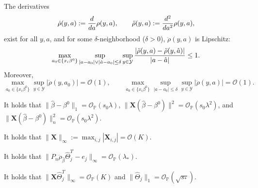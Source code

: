 \documentclass[aos,MSNbibl,dvips]{arximspdf}
\def\cal{\mathcal}
\newcommand{\PP}{\mathbb{P}}
\newcommand{\bx}{\mathbf{X}}
\begin{document}
\begin{longlist}[(C1)]
%
\item[(C1)]
The derivatives
%
\[
\dot\rho(y, a ):= {d \over d a} \rho(y, a),\qquad \ddot\rho(y, a ):=
{ d^2 \over d a^2 } \rho(y,a), %
\]
%
exist for all $y, a$, and for some $\delta$-neighborhood ($\delta>0$),
$\ddot\rho( y, a )$ is
Lip\-schitz:
%
\[
\max_{a_0 \in\{ x_i \beta^0\}} \sup_{ |a- a_0 | \vee| \hat a - a_0|
\le\delta} \sup
_{y \in{\cal Y}} { | \ddot\rho(y, a) - \ddot\rho
(y, \hat a) | \over|a - \hat a | } \le1.
\]
%
Moreover,
%
\[
\max_{a_0 \in\{ x_i \beta^0\}} \sup_{y \in{\cal Y} } \bigl| \dot\rho(y,
a_0)\bigr| = {\mathcal O}(1), \qquad\max_{a_0 \in\{ x_i \beta^0\}} \sup
_{|a - a_0
| \le\delta} \sup_{y
\in{\cal Y} }\bigl | \ddot\rho(y, a)\bigr| = {
\mathcal O}(1). %
\]


\item[(C2)] It holds that
$\| \hat\beta- \beta^0 \|_1 = {\mathcal
O}_{\PP} ( s_0 \lambda)$, $\|\bx(\hat{\beta} - \beta^0)\|^2 =
{\mathcal O}_{\PP} ( s_0 \lambda^2 )$, and $\| \bx( \hat\beta-
\beta^0
) \|_n^2 = {\mathcal O}_{\PP} ( s_0 \lambda^2 )$.

\item[(C3)] It holds that $ \|\mathbf{X} \|_{\infty}:= \max_{i,j}
|\bx
_{i,j} | ={\mathcal O}( K) $.

\item[(C4)] It holds that
$ \| P_n \ddot\rho_{\hat\beta} \hat\Theta_j^T - e_j \|_{\infty} =
{\mathcal O}_{\PP}(\lambda_*) $.


\item[(C5)] It holds that
$\|\bx\hat\Theta_j^T \|_{\infty} = {\mathcal O}_{\PP} (K)$ and $\|
\hat
\Theta_j \|_1 = {\mathcal O}_{\PP} (\sqrt{s_*}) $.


\end{longlist}
\end{document}
